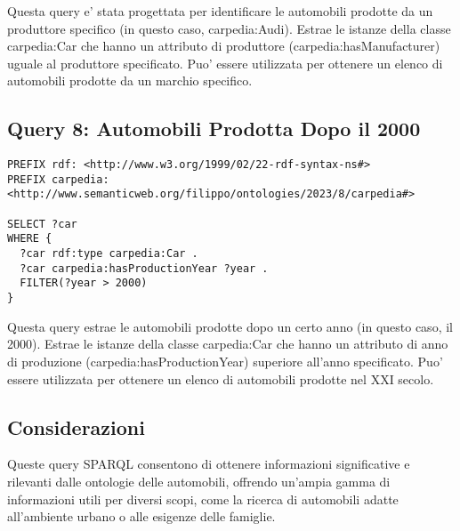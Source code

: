 Questa query e' stata progettata per identificare le automobili prodotte da un produttore specifico
(in questo caso, carpedia:Audi). Estrae le istanze della classe carpedia:Car che hanno un attributo di produttore
(carpedia:hasManufacturer) uguale al produttore specificato. Puo' essere utilizzata per ottenere un elenco
di automobili prodotte da un marchio specifico.

\subsection{Query 8: Automobili Prodotta Dopo il 2000}

\begin{lstlisting}[language=SPARQL]
PREFIX rdf: <http://www.w3.org/1999/02/22-rdf-syntax-ns#>
PREFIX carpedia: <http://www.semanticweb.org/filippo/ontologies/2023/8/carpedia#>

SELECT ?car
WHERE {
  ?car rdf:type carpedia:Car .
  ?car carpedia:hasProductionYear ?year .
  FILTER(?year > 2000)
}
\end{lstlisting}


Questa query estrae le automobili prodotte dopo un certo anno (in questo caso, il 2000).
Estrae le istanze della classe carpedia:Car che hanno un attributo di anno di produzione (carpedia:hasProductionYear)
superiore all'anno specificato.
Puo' essere utilizzata per ottenere un elenco di automobili prodotte nel XXI secolo.


\subsection{Considerazioni}
Queste query SPARQL consentono di ottenere informazioni significative e rilevanti dalle ontologie delle automobili,
offrendo un'ampia gamma di informazioni utili per diversi scopi, come la ricerca di automobili adatte all'ambiente
urbano o alle esigenze delle famiglie.
